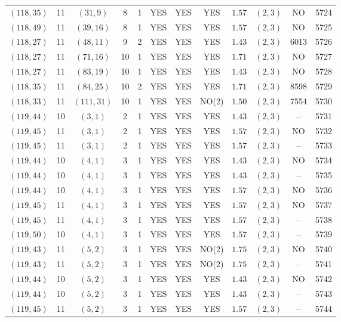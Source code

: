 \begin{longtable}{|c|c|c|c|c|c|c|c|c|c|c|c|}
$(118,35)$ & 11 & $(31,9)$ & 8 & 1 & YES & YES & YES & $1.57$ & $(2,3)$ & NO & 5724\\
$(118,49)$ & 11 & $(39,16)$ & 8 & 1 & YES & YES & YES & $1.57$ & $(2,3)$ & NO & 5725\\
$(118,27)$ & 11 & $(48,11)$ & 9 & 2 & YES & YES & YES & $1.43$ & $(2,3)$ & 6013 & 5726\\
$(118,27)$ & 11 & $(71,16)$ & 10 & 1 & YES & YES & YES & $1.71$ & $(2,3)$ & NO & 5727\\
$(118,27)$ & 11 & $(83,19)$ & 10 & 1 & YES & YES & YES & $1.43$ & $(2,3)$ & NO & 5728\\
$(118,35)$ & 11 & $(84,25)$ & 10 & 2 & YES & YES & YES & $1.71$ & $(2,3)$ & 8598 & 5729\\
$(118,33)$ & 11 & $(111,31)$ & 10 & 1 & YES & YES & NO(2) & $1.50$ & $(2,3)$ & 7554 & 5730\\
$(119,44)$ & 10 & $(3,1)$ & 2 & 1 & YES & YES & YES & $1.43$ & $(2,3)$ & -- & 5731\\
$(119,45)$ & 11 & $(3,1)$ & 2 & 1 & YES & YES & YES & $1.57$ & $(2,3)$ & NO & 5732\\
$(119,45)$ & 11 & $(3,1)$ & 2 & 1 & YES & YES & YES & $1.57$ & $(2,3)$ & -- & 5733\\
$(119,44)$ & 10 & $(4,1)$ & 3 & 1 & YES & YES & YES & $1.43$ & $(2,3)$ & NO & 5734\\
$(119,44)$ & 10 & $(4,1)$ & 3 & 1 & YES & YES & YES & $1.43$ & $(2,3)$ & -- & 5735\\
$(119,44)$ & 10 & $(4,1)$ & 3 & 1 & YES & YES & YES & $1.57$ & $(2,3)$ & NO & 5736\\
$(119,45)$ & 11 & $(4,1)$ & 3 & 1 & YES & YES & YES & $1.57$ & $(2,3)$ & NO & 5737\\
$(119,45)$ & 11 & $(4,1)$ & 3 & 1 & YES & YES & YES & $1.57$ & $(2,3)$ & -- & 5738\\
$(119,50)$ & 10 & $(4,1)$ & 3 & 1 & YES & YES & YES & $1.57$ & $(2,3)$ & -- & 5739\\
$(119,43)$ & 11 & $(5,2)$ & 3 & 1 & YES & YES & NO(2) & $1.75$ & $(2,3)$ & NO & 5740\\
$(119,43)$ & 11 & $(5,2)$ & 3 & 1 & YES & YES & NO(2) & $1.75$ & $(2,3)$ & -- & 5741\\
$(119,44)$ & 10 & $(5,2)$ & 3 & 1 & YES & YES & YES & $1.43$ & $(2,3)$ & NO & 5742\\
$(119,44)$ & 10 & $(5,2)$ & 3 & 1 & YES & YES & YES & $1.43$ & $(2,3)$ & -- & 5743\\
$(119,45)$ & 11 & $(5,2)$ & 3 & 1 & YES & YES & YES & $1.57$ & $(2,3)$ & -- & 5744\\

\end{longtable}
